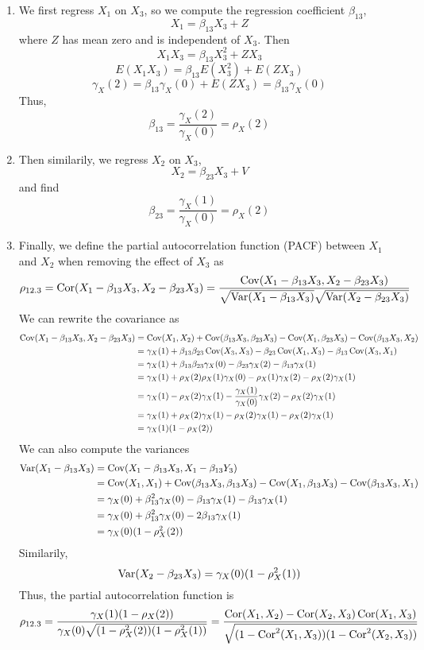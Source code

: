 \begin{enumerate}[label=(\roman*)]
    \item We first regress $X_1$ on $X_3$, so we compute the regression coefficient $\beta_{13}$,
    \[X_1 = \beta_{13}X_3 + Z\]
    where $Z$ has mean zero and is independent of $X_3$. Then 
    \[X_1X_3 = \beta_{13}X_3^2 + ZX_3\]
    \[E(X_1X_3) = \beta_{13}E(X_3^2) + E(ZX_3)\]
    \[\gamma_X(2) = \beta_{13}\gamma_X(0) + E(ZX_3) = \beta_{13}\gamma_X(0)\]
    Thus,
    \[\beta_{13} = \frac{\gamma_X(2)}{\gamma_X(0)} = \rho_X(2)\]
    \item Then similarily, we regress $X_2$ on $X_3$, 
    \[X_2 = \beta_{23}X_3 + V\]
    and find 
    \[\beta_{23} = \frac{\gamma_X(1)}{\gamma_X(0)} = \rho_X(2)\]
    \item Finally, we define the partial autocorrelation function (PACF) between $X_1$ and $X_2$ when removing the effect of $X_3$ as
    \[\rho_{12.3} = \operatorname{Cor}(X_1 - \beta_{13}X_3, X_2-\beta_{23}X_3) = \frac{\operatorname{Cov}(X_1 - \beta_{13}X_3, X_2 - \beta_{23}X_3)}{\sqrt{\operatorname{Var}(X_1-\beta_{13}X_3)}\sqrt{\operatorname{Var}(X_2-\beta_{23}X_3)}}\]
    We can rewrite the covariance as 
    \begin{align*}
        \operatorname{Cov}(X_1 - \beta_{13}X_3, X_2-\beta_{23}X_3) &= \operatorname{Cov}(X_1,X_2) + \operatorname{Cov}(\beta_{13}X_3, \beta_{23}X_3) - \operatorname{Cov}(X_1,\beta_{23}X_3) - \operatorname{Cov}(\beta_{13}X_3,X_2)\\
        &= \gamma_X(1) + \beta_{13}\beta_{23}\operatorname{Cov}(X_3,X_3) - \beta_{23}\operatorname{Cov}(X_1,X_3) - \beta_{13}\operatorname{Cov}(X_3,X_1)\\
        &= \gamma_X(1) + \beta_{13}\beta_{23}\gamma_X(0) - \beta_{23}\gamma_X(2) - \beta_{13}\gamma_X(1)\\
        &= \gamma_X(1) + \rho_X(2)\rho_X(1)\gamma_X(0) - \rho_X(1)\gamma_X(2) - \rho_X(2)\gamma_X(1)\\
        &= \gamma_X(1) - \rho_X(2)\gamma_X(1) - \frac{\gamma_X(1)}{\gamma_X(0)}\gamma_X(2) - \rho_X(2)\gamma_X(1)\\
        &= \gamma_X(1) + \rho_X(2)\gamma_X(1) - \rho_X(2)\gamma_X(1) - \rho_X(2)\gamma_X(1)\\
        &= \gamma_X(1)(1-\rho_X(2))
    \end{align*}
    We can also compute the variances 
    \begin{align*}
        \operatorname{Var}(X_1 - \beta_{13}X_3) &= \operatorname{Cov}(X_1 - \beta_{13}X_3, X_1 - \beta_{13}Y_3)\\
        &= \operatorname{Cov}(X_1,X_1) + \operatorname{Cov}(\beta_{13}X_3,\beta_{13}X_3) - \operatorname{Cov}(X_1,\beta_{13}X_3) - \operatorname{Cov}(\beta_{13}X_3,X_1)\\
        &= \gamma_X(0) + \beta_{13}^2\gamma_X(0) - \beta_{13}\gamma_X(1) - \beta_{13}\gamma_X(1)\\
        &= \gamma_X(0) + \beta_{13}^2\gamma_X(0) - 2\beta_{13}\gamma_X(1)\\
        &= \gamma_X(0)(1-\rho_X^2(2))
    \end{align*}
    Similarily, 
    \[\operatorname{Var}(X_2 - \beta_{23}X_3) = \gamma_X(0)(1- \rho_X^2(1))\]
    Thus, the partial autocorrelation function is
    \[\rho_{12.3} = \frac{\gamma_X(1)(1-\rho_X(2))}{\gamma_X(0)\sqrt{(1-\rho_X^2(2))(1-\rho_X^2(1))}} = \frac{\operatorname{Cor}(X_1,X_2) - \operatorname{Cor}(X_2,X_3)\operatorname{Cor}(X_1,X_3)}{\sqrt{(1-\operatorname{Cor}^2(X_1,X_3))(1-\operatorname{Cor}^2(X_2,X_3))}}\]
\end{enumerate}

